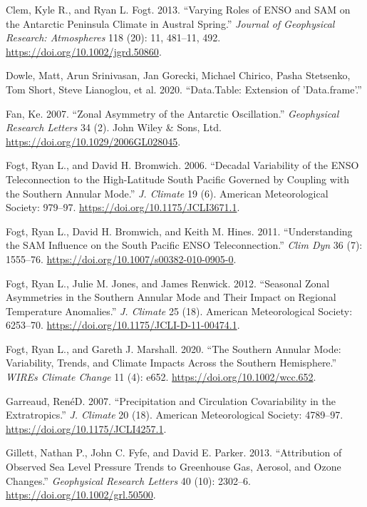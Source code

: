 \documentclass[smallextended]{svjour3}       %
\begin{document}
\leavevmode\hypertarget{ref-clem2013}{}%
Clem, Kyle R., and Ryan L. Fogt. 2013. ``Varying Roles of ENSO and SAM on the Antarctic Peninsula Climate in Austral Spring.'' \emph{Journal of Geophysical Research: Atmospheres} 118 (20): 11, 481--11, 492. \url{https://doi.org/10.1002/jgrd.50860}.

\leavevmode\hypertarget{ref-dowle2020}{}%
Dowle, Matt, Arun Srinivasan, Jan Gorecki, Michael Chirico, Pasha Stetsenko, Tom Short, Steve Lianoglou, et al. 2020. ``Data.Table: Extension of 'Data.frame'.''

\leavevmode\hypertarget{ref-fan2007}{}%
Fan, Ke. 2007. ``Zonal Asymmetry of the Antarctic Oscillation.'' \emph{Geophysical Research Letters} 34 (2). John Wiley \& Sons, Ltd. \url{https://doi.org/10.1029/2006GL028045}.

\leavevmode\hypertarget{ref-fogt2006}{}%
Fogt, Ryan L., and David H. Bromwich. 2006. ``Decadal Variability of the ENSO Teleconnection to the High-Latitude South Pacific Governed by Coupling with the Southern Annular Mode.'' \emph{J. Climate} 19 (6). American Meteorological Society: 979--97. \url{https://doi.org/10.1175/JCLI3671.1}.

\leavevmode\hypertarget{ref-fogt2011}{}%
Fogt, Ryan L., David H. Bromwich, and Keith M. Hines. 2011. ``Understanding the SAM Influence on the South Pacific ENSO Teleconnection.'' \emph{Clim Dyn} 36 (7): 1555--76. \url{https://doi.org/10.1007/s00382-010-0905-0}.

\leavevmode\hypertarget{ref-fogt2012}{}%
Fogt, Ryan L., Julie M. Jones, and James Renwick. 2012. ``Seasonal Zonal Asymmetries in the Southern Annular Mode and Their Impact on Regional Temperature Anomalies.'' \emph{J. Climate} 25 (18). American Meteorological Society: 6253--70. \url{https://doi.org/10.1175/JCLI-D-11-00474.1}.

\leavevmode\hypertarget{ref-fogt2020}{}%
Fogt, Ryan L., and Gareth J. Marshall. 2020. ``The Southern Annular Mode: Variability, Trends, and Climate Impacts Across the Southern Hemisphere.'' \emph{WIREs Climate Change} 11 (4): e652. \url{https://doi.org/10.1002/wcc.652}.

\leavevmode\hypertarget{ref-garreaud2007}{}%
Garreaud, RenéD. 2007. ``Precipitation and Circulation Covariability in the Extratropics.'' \emph{J. Climate} 20 (18). American Meteorological Society: 4789--97. \url{https://doi.org/10.1175/JCLI4257.1}.

\leavevmode\hypertarget{ref-gillett2013}{}%
Gillett, Nathan P., John C. Fyfe, and David E. Parker. 2013. ``Attribution of Observed Sea Level Pressure Trends to Greenhouse Gas, Aerosol, and Ozone Changes.'' \emph{Geophysical Research Letters} 40 (10): 2302--6. \url{https://doi.org/10.1002/grl.50500}.
\end{document}
